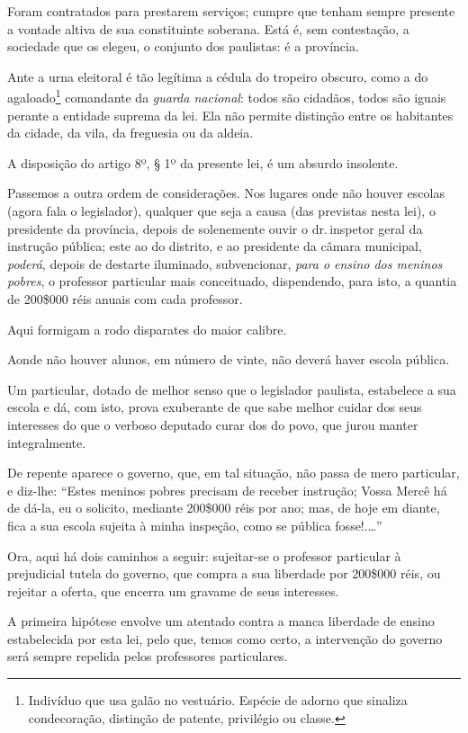Foram contratados para prestarem serviços; cumpre que tenham sempre
presente a vontade altiva de sua constituinte soberana. Está é, sem
contestação, a sociedade que os elegeu, o conjunto dos paulistas: é a
província.

Ante a urna eleitoral é tão legítima a cédula do tropeiro obscuro, como
a do agaloado\footnote{Indivíduo que usa galão no vestuário. Espécie
  de adorno que sinaliza condecoração, distinção de patente, privilégio
  ou classe.} comandante da \emph{guarda nacional}: todos são cidadãos,
todos são iguais perante a entidade suprema da lei. Ela não permite
distinção entre os habitantes da cidade, da vila, da freguesia ou da
aldeia.

A disposição do artigo 8º, § 1º da presente lei, é um absurdo insolente.

Passemos a outra ordem de considerações. Nos lugares onde não houver
escolas (agora fala o legislador), qualquer que seja a causa (das
previstas nesta lei), o presidente da província, depois de solenemente
ouvir o dr.\,inspetor geral da instrução pública; este ao do distrito, e
ao presidente da câmara municipal, \emph{poderá}, depois de destarte
iluminado, subvencionar, \emph{para o ensino dos meninos pobres}, o
professor particular mais conceituado, dispendendo, para isto, a quantia
de 200\$000 réis anuais com cada professor.

Aqui formigam a rodo disparates do maior calibre.

Aonde não houver alunos, em número de vinte, não deverá haver escola
pública.

Um particular, dotado de melhor senso que o legislador paulista,
estabelece a sua escola e dá, com isto, prova exuberante de que sabe
melhor cuidar dos seus interesses do que o verboso deputado curar dos do
povo, que jurou manter integralmente.

De repente aparece o governo, que, em tal situação, não passa de mero
particular, e diz-lhe: ``Estes meninos pobres precisam de receber
instrução; Vossa Mercê há de dá-la, eu o solicito, mediante 200\$000
réis por ano; mas, de hoje em diante, fica a sua escola sujeita à minha
inspeção, como se pública fosse!.\ldots''

Ora, aqui há dois caminhos a seguir: sujeitar-se o professor particular
à prejudicial tutela do governo, que compra a sua liberdade por 200\$000
réis, ou rejeitar a oferta, que encerra um gravame de seus interesses.

A primeira hipótese envolve um atentado contra a manca liberdade de
ensino estabelecida por esta lei, pelo que, temos como certo, a
intervenção do governo será sempre repelida pelos professores
particulares.

